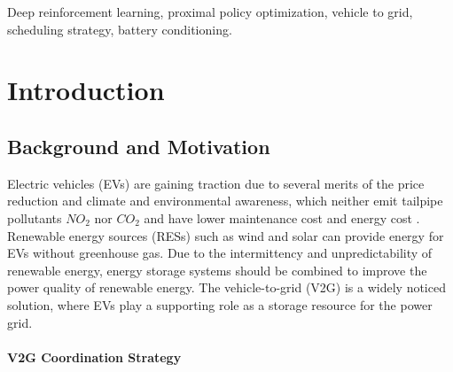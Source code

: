 \documentclass[journal,twoside]{IEEEtran}
\begin{document}
\begin{IEEEkeywords}
 Deep reinforcement learning, proximal policy optimization, vehicle to grid, scheduling strategy, battery conditioning.
\end{IEEEkeywords}

\section{Introduction}
\label{sec:introduction}
\subsection{Background and Motivation}
Electric vehicles (EVs) are gaining traction due to several merits of the price reduction and climate and environmental awareness, which neither emit tailpipe pollutants $NO_2$ nor $CO_2$ and have lower maintenance cost and energy cost \cite{sanguesa2021review}. Renewable energy sources (RESs) such as wind and solar can provide energy for EVs without greenhouse gas. Due to the intermittency and unpredictability of renewable energy, energy storage systems should be combined to improve the power quality of renewable energy. The vehicle-to-grid (V2G) is a widely noticed solution, where EVs play a supporting role as a storage resource for the power grid\cite{bibak2021comprehensive}.

\paragraph{V2G Coordination Strategy}
\end{document}

